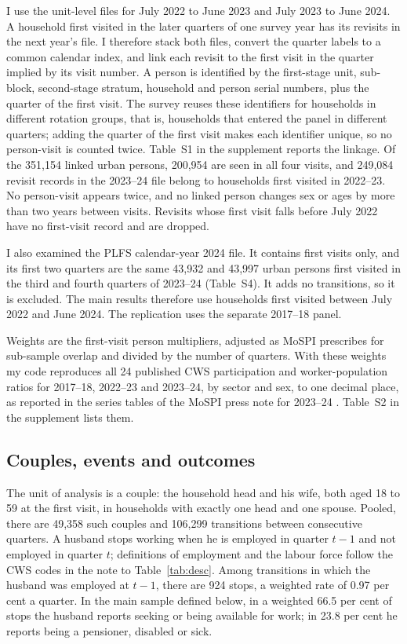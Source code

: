 I use the unit-level files for July 2022 to June 2023 and July 2023 to June 2024. A household first visited in the later quarters of one survey year has its revisits in the next year's file. I therefore stack both files, convert the quarter labels to a common calendar index, and link each revisit to the first visit in the quarter implied by its visit number. A person is identified by the first-stage unit, sub-block, second-stage stratum, household and person serial numbers, plus the quarter of the first visit. The survey reuses these identifiers for households in different rotation groups, that is, households that entered the panel in different quarters; adding the quarter of the first visit makes each identifier unique, so no person-visit is counted twice. Table~S1 in the supplement reports the linkage. Of the 351,154 linked urban persons, 200,954 are seen in all four visits, and 249,084 revisit records in the 2023--24 file belong to households first visited in 2022--23. No person-visit appears twice, and no linked person changes sex or ages by more than two years between visits. Revisits whose first visit falls before July 2022 have no first-visit record and are dropped.

I also examined the PLFS calendar-year 2024 file. It contains first visits only, and its first two quarters are the same 43,932 and 43,997 urban persons first visited in the third and fourth quarters of 2023--24 (Table~S4). It adds no transitions, so it is excluded. The main results therefore use households first visited between July 2022 and June 2024. The replication uses the separate 2017--18 panel.

Weights are the first-visit person multipliers, adjusted as MoSPI prescribes for sub-sample overlap and divided by the number of quarters. With these weights my code reproduces all 24 published CWS participation and worker-population ratios for 2017--18, 2022--23 and 2023--24, by sector and sex, to one decimal place, as reported in the series tables of the MoSPI press note for 2023--24 \citep{mospi2024}. Table~S2 in the supplement lists them.

\subsection{Couples, events and outcomes}

The unit of analysis is a couple: the household head and his wife, both aged 18 to 59 at the first visit, in households with exactly one head and one spouse. Pooled, there are 49,358 such couples and 106,299 transitions between consecutive quarters. A husband stops working when he is employed in quarter $t-1$ and not employed in quarter $t$; definitions of employment and the labour force follow the CWS codes in the note to Table~\ref{tab:desc}. Among transitions in which the husband was employed at $t-1$, there are 924 stops, a weighted rate of 0.97 per cent a quarter. In the main sample defined below, in a weighted 66.5 per cent of stops the husband reports seeking or being available for work; in 23.8 per cent he reports being a pensioner, disabled or sick.

